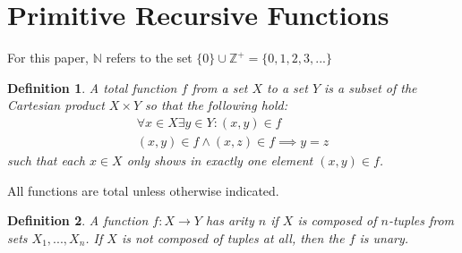 \documentclass[12pt, letterpaper]{article}
\newtheorem*{definition}{Definition}
\theoremstyle{case}
\begin{document}
  \section{Primitive Recursive Functions}
    For this paper, $\mathbb{N}$ refers to the set $\{0\} \cup \mathbb{Z}^+ = \{0, 1, 2, 3, ...\}$
    
    \begin{definition}
      A total function $f$ from a set $X$ to a set $Y$ is a subset of the Cartesian product $X \times Y$ so that the following hold:
      \begin{equation*}
        \begin{gathered}
          \forall x \in X \exists y \in Y : (x, y) \in f \\
          (x, y) \in f \wedge (x, z) \in f \implies y = z
        \end{gathered}
      \end{equation*}
      such that each $x \in X$ only shows in exactly one element $(x, y) \in f$.
    \end{definition}

    All functions are total unless otherwise indicated.

    \begin{definition}
      A function $f: X \rightarrow Y$ has arity $n$ if $X$ is composed of $n$-tuples from sets $X_1, ..., X_n$.
      If $X$ is not composed of tuples at all, then the $f$ is unary.
    \end{definition}
\end{document}
